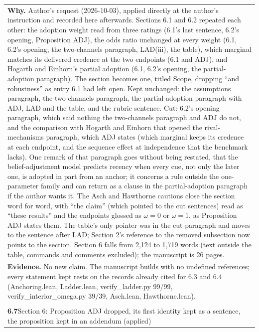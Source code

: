 \documentclass[10pt]{article}
\theoremstyle{definition}
\newlength{\fullw}\setlength{\fullw}{25.9cm}
\newcommand{\entryhead}[2]{\multicolumn{3}{|l|}{\rule{0pt}{2.6ex}\large\textbf{#1}\quad #2} \\ \hline}
\begin{document}
{\begin{longtable}{|p{0.9cm}|p{12.2cm}|p{12.2cm}|}
\multicolumn{3}{|p{\fullw}|}{\textbf{Why.} Author's request (2026-10-03), applied directly at the author's instruction and recorded here afterwards. Sections 6.1 and 6.2 repeated each other: the adoption weight read from three ratings (6.1's last sentence, 6.2's opening, Proposition ADJ), the odds ratio unchanged at every weight (6.1, 6.2's opening, the two-channels paragraph, LAD(iii), the table), which marginal matches its delivered credence at the two endpoints (6.1 and ADJ), and Hogarth and Einhorn's partial adoption (6.1, 6.2's opening, the partial-adoption paragraph). The section becomes one, titled Scope, dropping ``and robustness'' as entry 6.1 had left open. Kept unchanged: the assumptions paragraph, the two-channels paragraph, the partial-adoption paragraph with ADJ, LAD and the table, and the rubric sentence. Cut: 6.2's opening paragraph, which said nothing the two-channels paragraph and ADJ do not, and the comparison with Hogarth and Einhorn that opened the rival-mechanisms paragraph, which ADJ states (which marginal keeps its credence at each endpoint, and the sequence effect at independence that the benchmark lacks). One remark of that paragraph goes without being restated, that the belief-adjustment model predicts recency when every cue, not only the later one, is adopted in part from an anchor; it concerns a rule outside the one-parameter family and can return as a clause in the partial-adoption paragraph if the author wants it. The Asch and Hawthorne cautions close the section word for word, with ``the claim'' (which pointed to the cut sentences) read as ``these results'' and the endpoints glossed as $\omega=0$ or $\omega=1$, as Proposition ADJ states them. The table's only pointer was in the cut paragraph and moves to the sentence after LAD; Section 2's reference to the removed subsection now points to the section. Section 6 falls from 2,124 to 1,719 words (text outside the table, commands and comments excluded); the manuscript is 26 pages.} \\
\multicolumn{3}{|p{\fullw}|}{\textbf{Evidence.} No new claim. The manuscript builds with no undefined references; every statement kept rests on the records already cited for 6.3 and 6.4 (Anchoring.lean, Ladder.lean, verify\_ladder.py 99/99, verify\_interior\_omega.py 39/39, Asch.lean, Hawthorne.lean).} \\ \hline
\multicolumn{3}{|l|}{} \\ \hline
\entryhead{6.7}{Section 6: Proposition ADJ dropped, its first identity kept as a sentence, the proposition kept in an addendum (applied)\quad{\footnotesize\textit{(formerly C.24)}}}

\end{longtable}}
\end{document}
